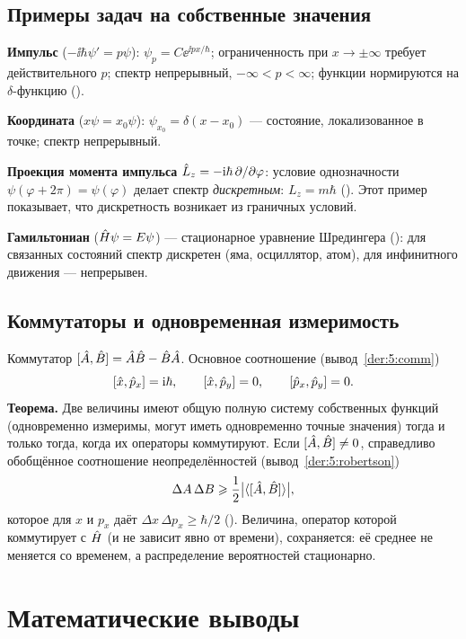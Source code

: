 \subsection{Примеры задач на собственные значения}

\textbf{Импульс} ($-\ii\hbar\psi'=p\psi$): $\psi_p=C\ee^{\ii px/\hbar}$; ограниченность при
$x\to\pm\infty$ требует действительного $p$; спектр непрерывный, $-\infty<p<\infty$; функции
нормируются на $\delta$-функцию ().

\textbf{Координата} ($x\psi=x_0\psi$): $\psi_{x_0}=\delta(x-x_0)$ — состояние, локализованное в точке;
спектр непрерывный.

\textbf{Проекция момента импульса} $\hat{L}_z=-\mathrm{i}\hbar\,\partial/\partial\varphi$: условие однозначности
$\psi(\varphi+2\pi)=\psi(\varphi)$ делает спектр \emph{дискретным}: $L_z=m\hbar$ ().
Этот пример показывает, что дискретность возникает из граничных условий.

\textbf{Гамильтониан} ($\hat{H}\psi=E\psi$) — стационарное уравнение Шредингера ():
для связанных состояний спектр дискретен (яма, осциллятор, атом), для инфинитного
движения — непрерывен.

\subsection{Коммутаторы и одновременная измеримость}

Коммутатор $[\hat{A},\hat{B}]=\hat{A}\hat{B}-\hat{B}\hat{A}$. Основное соотношение (вывод~\ref{der:5:comm})
\begin{equation}\label{eq:5:xp}
  [\hat{x},\hat{p}_x]=\mathrm{i}\hbar,\qquad [\hat{x},\hat{p}_y]=0,\qquad [\hat{p}_x,\hat{p}_y]=0 .
\end{equation}
\textbf{Теорема.} Две величины имеют общую полную систему собственных функций (одновременно
измеримы, могут иметь одновременно точные значения) тогда и только тогда, когда их операторы
коммутируют. Если $[\hat{A},\hat{B}]\neq0$, справедливо обобщённое соотношение неопределённостей
(вывод~\ref{der:5:robertson})
\begin{equation}\label{eq:5:rob}
  \Delta A\,\Delta B\geqslant\frac12\bigl|\langle[\hat{A},\hat{B}]\rangle\bigr| ,
\end{equation}
которое для $x$ и $p_x$ даёт $\Delta x\,\Delta p_x\ge\hbar/2$ ().
Величина, оператор которой коммутирует с $\hat{H}$ (и не зависит явно от времени), сохраняется:
её среднее не меняется со временем, а распределение вероятностей стационарно.

\section{Математические выводы}

